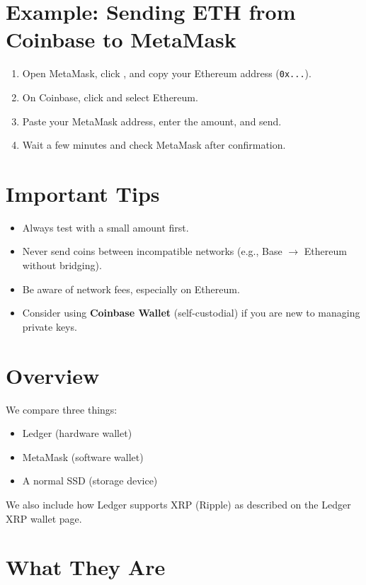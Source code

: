 \documentclass{article}
\begin{document}
\section{Example: Sending ETH from Coinbase to MetaMask}
\begin{enumerate}
    \item Open MetaMask, click , and copy your Ethereum address (\texttt{0x...}).
    \item On Coinbase, click  and select Ethereum.
    \item Paste your MetaMask address, enter the amount, and send.
    \item Wait a few minutes and check MetaMask after confirmation.
\end{enumerate}

\section{Important Tips}
\begin{itemize}
    \item Always test with a small amount first.
    \item Never send coins between incompatible networks (e.g., Base $\rightarrow$ Ethereum without bridging).
    \item Be aware of network fees, especially on Ethereum.
    \item Consider using \textbf{Coinbase Wallet} (self-custodial) if you are new to managing private keys.
\end{itemize}


\newpage


\section*{Overview}
We compare three things:
\begin{itemize}
  \item Ledger (hardware wallet)  
  \item MetaMask (software wallet)  
  \item A normal SSD (storage device)  
\end{itemize}
We also include how Ledger supports XRP (Ripple) as described on the Ledger XRP wallet page.

\section{What They Are}
\end{document}

